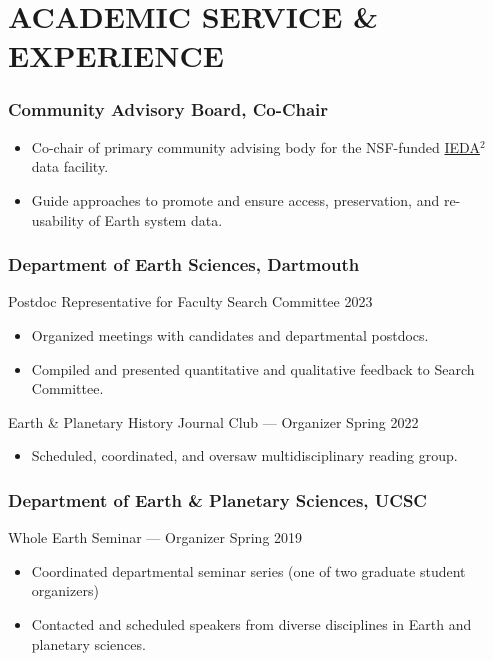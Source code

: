 \section*{ACADEMIC SERVICE \& EXPERIENCE}

\subsubsection*{Community Advisory Board, \normalfont Co-Chair}
\begin{itemize}
	\item Co-chair of primary community advising body for the NSF-funded \href{https://www.iedadata.org/}{IEDA$^2$} data facility.
	\item Guide approaches to promote and ensure access, preservation, and re-usability of Earth system data.
\end{itemize}

\subsubsection*{Department of Earth Sciences, Dartmouth}
Postdoc Representative for Faculty Search Committee \hfill 2023
\begin{itemize}
	\item Organized meetings with candidates and departmental postdocs.
	\item Compiled and presented quantitative and qualitative feedback to Search Committee.
\end{itemize}\vspace*{1ex}

Earth \& Planetary History Journal Club --- Organizer 	 \hfill	Spring 2022
\begin{itemize}
	\item Scheduled, coordinated, and oversaw multidisciplinary reading group.
\end{itemize}

\subsubsection*{Department of Earth \& Planetary Sciences, UCSC}
Whole Earth Seminar --- Organizer \hfill  Spring 2019
\begin{itemize}
	\item Coordinated departmental seminar series (one of two graduate student organizers)
	\item Contacted and scheduled speakers from diverse disciplines in Earth and planetary sciences.
\end{itemize}

